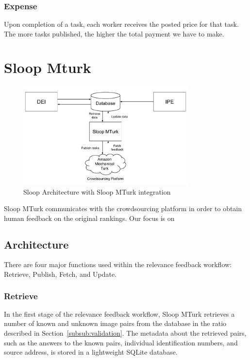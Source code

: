   \subsubsection{Expense}

  Upon completion of a task, each worker receives the posted price for that
  task. The more tasks published, the higher the total payment we have to make.



\section{Sloop Mturk} %
\label{sec:sloop_mturk}

  \begin{figure}[htb]
    \centering
    \includegraphics[width=0.8\textwidth]{sloop/turk_system}
    \caption{Sloop Architecture with Sloop MTurk integration}
    \label{fig:turk_overview} %
  \end{figure}

  Sloop MTurk communicates with the crowdsourcing platform in order to obtain
  human feedback on the original rankings. Our focus is on

  \subsection{Architecture}

  There are four major functions used within the relevance feedback
  workflow: Retrieve, Publish, Fetch, and Update.

  \subsubsection{Retrieve}

  In the first stage of the relevance feedback workflow, Sloop MTurk retrieves a
  number of known and unknown image pairs from the database in the ratio
  described in Section~\ref{subsub:validation}. The metadata about the retrieved
  pairs, such as the answers to the known pairs, individual identification
  numbers, and source address, is stored in a lightweight SQLite database.

